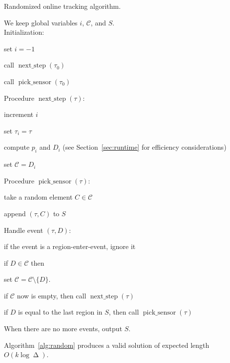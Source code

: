 \documentclass[runningheads]{llncs}
\newcommand {\script} [1] {\ensuremath {\mathcal {#1}}}
\DeclareMathOperator {\ply}{\Delta}
\DeclareMathOperator {\nextstep}{next\_step}
\DeclareMathOperator {\picksensor}{pick\_sensor}
\begin{document}
      
      \begin {algorithm} [ht]
        \caption {Randomized online tracking algorithm.} \label {alg:random}
        We keep global variables $i$, $\script C$, and $S$.\\
        Initialization:
        \begin {compactenum}
          \item set $i = -1$
          \item call $\nextstep (\tau_0)$
          \item call $\picksensor (\tau_0)$
        \end {compactenum}
        Procedure $\nextstep (\tau)$:
        \begin {compactenum}
          \item increment $i$
          \item set $\tau_i = \tau$
          \item compute $p_i$ and $D_i$ (see Section~\ref {sec:runtime} for efficiency considerations)
          \item set $\script C = D_i$
        \end {compactenum}
        Procedure $\picksensor (\tau)$:
        \begin {compactenum}
          \item take a random element $C \in \script C$
          \item append $(\tau, C)$ to $S$
        \end {compactenum}
        Handle event $(\tau, D)$:
        \begin {compactenum}
          \item if the event is a region-enter-event, ignore it
          \item if $D \in \script C$ then
          \begin {compactenum}
            \item set $\script C = \script C \setminus \{D\}$.
            \item if $\script C$ now is empty, then call $\nextstep (\tau)$
            \item if $D$ is equal to the last region in $S$, then call $\picksensor (\tau)$
          \end {compactenum}         
        \end {compactenum}
        When there are no more events, output $S$.
      \end{algorithm}


      \begin {lemma} \label {lem:randomlog}
        Algorithm~\ref {alg:random} produces a valid solution of expected length $O (k \log \ply)$.
      \end {lemma}
      
\end{document}
